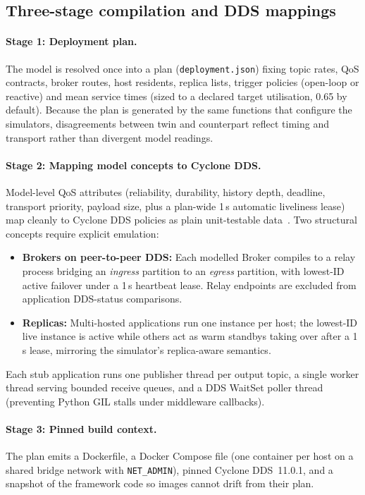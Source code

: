 \subsection{Three-stage compilation and DDS mappings}

\paragraph{Stage 1: Deployment plan.} The model is resolved once into a plan (\texttt{deployment.json}) fixing topic rates, QoS contracts, broker routes, host residents, replica lists, trigger policies (open-loop or reactive) and mean service times (sized to a declared target utilisation, 0.65 by default). Because the plan is generated by the same functions that configure the simulators, disagreements between twin and counterpart reflect timing and transport rather than divergent model readings.

\paragraph{Stage 2: Mapping model concepts to Cyclone DDS.} Model-level QoS attributes (reliability, durability, history depth, deadline, transport priority, payload size, plus a plan-wide 1\,s automatic liveliness lease) map cleanly to Cyclone DDS policies as plain unit-testable data~\citep{sag-software}. Two structural concepts require explicit emulation:
\begin{itemize}[leftmargin=*,nosep]
  \item \textbf{Brokers on peer-to-peer DDS:} Each modelled \textsf{Broker} compiles to a relay process bridging an \emph{ingress} partition to an \emph{egress} partition, with lowest-ID active failover under a 1\,s heartbeat lease. Relay endpoints are excluded from application DDS-status comparisons.
  \item \textbf{Replicas:} Multi-hosted applications run one instance per host; the lowest-ID live instance is active while others act as warm standbys taking over after a 1\,s lease, mirroring the simulator's replica-aware semantics.
\end{itemize}
Each stub application runs one publisher thread per output topic, a single worker thread serving bounded receive queues, and a DDS WaitSet poller thread (preventing Python GIL stalls under middleware callbacks).

\paragraph{Stage 3: Pinned build context.} The plan emits a Dockerfile, a Docker Compose file (one container per host on a shared bridge network with \texttt{NET\_ADMIN}), pinned Cyclone DDS~11.0.1, and a snapshot of the framework code so images cannot drift from their plan.


